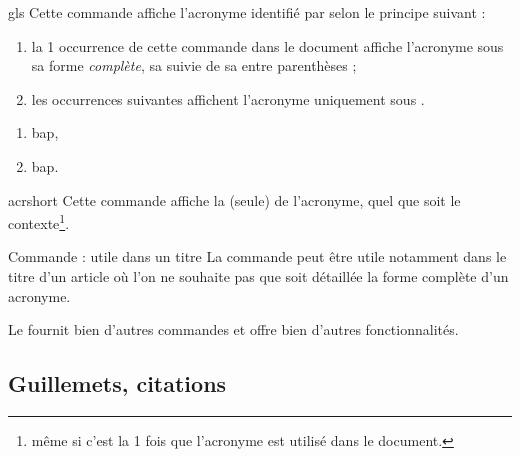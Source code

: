 \documentclass[french,nolocaltoc]{nwejmart}
\newtheorem[style=definition]{fait}
\newtheorem[title=expérience]{experience}
\newtheorem[title-plural=anneaux]{anneau}
\newtheorem[title=idéal,title-plural=idéaux]{ideal}
\begin{document}
\begin{docCommand}{gls}{}
  Cette commande affiche l'acronyme identifié par  selon le principe
  suivant :
  \begin{enumerate}
  \item la 1\iere{} occurrence de cette commande dans le document affiche
    l'acronyme sous sa forme \emph{complète}, \ie*{} sa 
    suivie de sa  entre parenthèses ;
  \item les occurrences suivantes affichent l'acronyme uniquement sous
    .
  \end{enumerate}
\end{docCommand}

\begin{preamblecode}[listing options={alsolanguage={[glossaries]TeX}}]
\end{preamblecode}
\begin{bodycode}[listing and text,listing options={alsolanguage={[glossaries]TeX}}]
\begin{enumerate}
\item \gls{bap},
\item \gls{bap}.
\end{enumerate}
\end{bodycode}

\begin{docCommand}{acrshort}{}
  Cette commande affiche la  (seule) de l'acronyme, quel que
  soit le contexte\footnote{\Ie*{} même si c'est la 1\iere{} fois que l'acronyme
    est utilisé dans le document.}.
\end{docCommand}

\begin{dbremark}{Commande  : utile dans un titre}{}
  La commande  peut être utile notamment dans le titre d'un
  article où l'on ne souhaite pas que soit détaillée la forme complète d'un
  acronyme.
\end{dbremark}

Le  fournit bien d'autres commandes et offre bien d'autres
fonctionnalités\autocite[Pour plus de détails, cf. par exemple][]{Bitouze7}.

\subsection{Guillemets, citations}
\label{sec-guillemets-citations}
\end{document}
